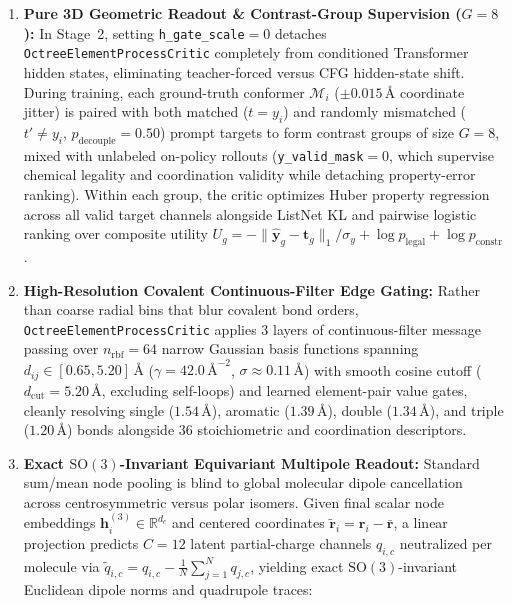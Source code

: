 \documentclass[11pt,a4paper]{article}
\begin{document}
\begin{enumerate}[leftmargin=1.6em,itemsep=2pt,topsep=2pt]
    \item \textbf{Pure 3D Geometric Readout \& Contrast-Group Supervision ($G=8$):} In Stage~2, setting \texttt{h\_gate\_scale}$=0$ detaches \texttt{Octree\allowbreak Element\allowbreak ProcessCritic} completely from conditioned Transformer hidden states, eliminating teacher-forced versus CFG hidden-state shift. During training, each ground-truth conformer $\mathcal{M}_i$ ($\pm 0.015\,\text{\AA}$ coordinate jitter) is paired with both matched ($t = y_i$) and randomly mismatched ($t' \ne y_i$, $p_{\text{decouple}}=0.50$) prompt targets to form contrast groups of size $G=8$, mixed with unlabeled on-policy rollouts (\texttt{y\_valid\_mask}$=0$, which supervise chemical legality and coordination validity while detaching property-error ranking). Within each group, the critic optimizes Huber property regression across all valid target channels alongside ListNet KL and pairwise logistic ranking over composite utility $U_g = -\|\hat{\mathbf{y}}_g - \mathbf{t}_g\|_1/\sigma_y + \log p_{\text{legal}} + \log p_{\text{constr}}$.
    \item \textbf{High-Resolution Covalent Continuous-Filter Edge Gating:} Rather than coarse radial bins that blur covalent bond orders, \texttt{Octree\allowbreak Element\allowbreak ProcessCritic} applies $3$ layers of continuous-filter message passing over $n_{\text{rbf}} = 64$ narrow Gaussian basis functions spanning $d_{ij} \in [0.65, 5.20]\,\text{\AA}$ ($\gamma = 42.0\,\text{\AA}^{-2}$, $\sigma \approx 0.11\,\text{\AA}$) with smooth cosine cutoff ($d_{\text{cut}} = 5.20\,\text{\AA}$, excluding self-loops) and learned element-pair value gates, cleanly resolving single ($1.54\,\text{\AA}$), aromatic ($1.39\,\text{\AA}$), double ($1.34\,\text{\AA}$), and triple ($1.20\,\text{\AA}$) bonds alongside $36$ stoichiometric and coordination descriptors.
    \item \textbf{Exact $\text{SO}(3)$-Invariant Equivariant Multipole Readout:} Standard sum/mean node pooling is blind to global molecular dipole cancellation across centrosymmetric versus polar isomers. Given final scalar node embeddings $\mathbf{h}_i^{(3)} \in \mathbb{R}^{d_c}$ and centered coordinates $\tilde{\mathbf{r}}_i = \mathbf{r}_i - \bar{\mathbf{r}}$, a linear projection predicts $C=12$ latent partial-charge channels $q_{i,c}$ neutralized per molecule via $\tilde{q}_{i,c} = q_{i,c} - \frac{1}{N}\sum_{j=1}^N q_{j,c}$, yielding exact $\text{SO}(3)$-invariant Euclidean dipole norms and quadrupole traces:

\end{enumerate}
\end{document}
